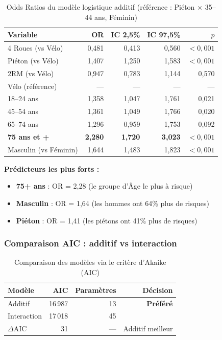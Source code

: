 \documentclass[12pt,a4paper]{article}
\begin{document}
\begin{table}[H]
\centering
\caption{Odds Ratios du modèle logistique additif
         (référence : Piéton $\times$ 35--44 ans, Féminin)}
\label{tab:logistic}
\small
\begin{tabular}{@{}l r r r r@{}}
\toprule
\textbf{Variable} & \textbf{OR} & \textbf{IC 2,5\%} & \textbf{IC 97,5\%} & \textbf{$p$} \\
\midrule
4 Roues (vs Vélo)       & 0,481 & 0,413 & 0,560 & $< 0,001$ \\
Piéton (vs Vélo)        & 1,407 & 1,250 & 1,583 & $< 0,001$ \\
2RM (vs Vélo)           & 0,947 & 0,783 & 1,144 & 0,570 \\
Vélo (référence)        & ---   & ---   & ---   & --- \\
\midrule
18--24 ans               & 1,358 & 1,047 & 1,761 & 0,021 \\
45--54 ans               & 1,361 & 1,049 & 1,766 & 0,020 \\
65--74 ans               & 1,296 & 0,959 & 1,753 & 0,092 \\
\textbf{75 ans et +}    & \textbf{2,280} & \textbf{1,720} & \textbf{3,023} & $< 0,001$ \\
\midrule
Masculin (vs Féminin)    & 1,644 & 1,483 & 1,823 & $< 0,001$ \\
\bottomrule
\end{tabular}
\end{table}

\textbf{Prédicteurs les plus forts :}
\begin{itemize}
  \item \textbf{75+ ans} : OR = 2,28 (le groupe d'\^Age le plus à risque)
  \item \textbf{Masculin} : OR = 1,64 (les hommes ont 64\% plus de risques)
  \item \textbf{Piéton} : OR = 1,41 (les piétons ont 41\% plus de risques)
\end{itemize}

\subsubsection{Comparaison AIC : additif vs interaction}

\begin{table}[H]
\centering
\caption{Comparaison des modèles via le critère d'Akaike (AIC)}
\label{tab:aic}
\begin{tabular}{@{}l r r r@{}}
\toprule
\textbf{Modèle} & \textbf{AIC} & \textbf{Paramètres} & \textbf{Décision} \\
\midrule
Additif     & 16\,987 & 13 & \textbf{Préféré} \\
Interaction & 17\,018 & 45 & \\
\midrule
$\Delta$AIC & 31 & --- & Additif meilleur \\
\bottomrule
\end{tabular}
\end{table}
\end{document}
